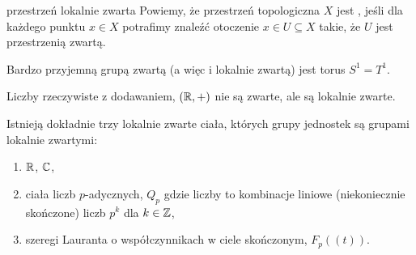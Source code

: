 \begin{definition}{przestrzeń lokalnie zwarta}{}
  Powiemy, że przestrzeń topologiczna $X$ jest , jeśli dla każdego punktu $x\in X$ potrafimy znaleźć otoczenie $x\in U\subseteq X$ takie, że $U$ jest przestrzenią zwartą.
\end{definition}

\begin{example}[m]
\item Bardzo przyjemną grupą zwartą (a więc i lokalnie zwartą) jest torus $S^1=T^1$.
\item Liczby rzeczywiste z dodawaniem, $(\mathbb{R}, +)$ nie są zwarte, ale są lokalnie zwarte.
\item Istnieją dokładnie trzy lokalnie zwarte ciała, których grupy jednostek są grupami lokalnie zwartymi:
  \begin{enumerate}
    \item $\mathbb{R}$, $\mathbb{C}$,
    \item ciała liczb $p$-adycznych, $Q_p$ gdzie liczby to kombinacje liniowe (niekoniecznie skończone) liczb $p^{k}$ dla $k\in\mathbb{Z}$,
    \item szeregi Lauranta o współczynnikach w ciele skończonym, $F_p((t))$.
  \end{enumerate}
\end{example}

%


%









